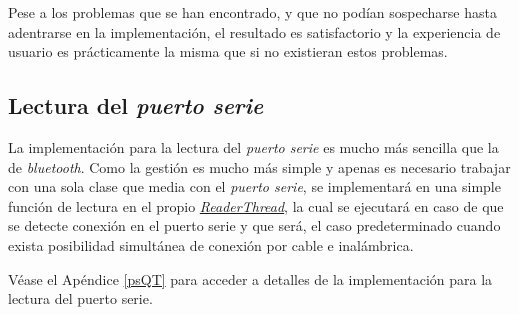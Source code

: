 Pese a los problemas que se han encontrado, y que no podían sospecharse
hasta adentrarse en la implementación, el resultado es satisfactorio
y la experiencia de usuario es prácticamente la misma que si no
existieran estos problemas.


\subsection{Lectura del \textit{puerto serie}}
La implementación para la lectura del \textit{puerto serie} es mucho más sencilla
que la de \textit{bluetooth}. Como la gestión es mucho más simple
y apenas es necesario trabajar con una sola clase que media con el
\textit{puerto serie}, se implementará en una simple función de lectura
en el propio
\href{https://github.com/AntonioPriego/SmartPen/blob/main/SmartPenUI/readerthread.cpp}{\textit{ReaderThread}},
la cual se ejecutará en caso de que
se detecte conexión en el puerto serie y que será, el caso predeterminado
cuando exista posibilidad simultánea de conexión por cable e inalámbrica.

Véase el Apéndice \ref{psQT} para acceder a detalles de la implementación
para la lectura del puerto serie.